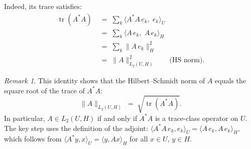 \documentclass[11pt]{article}
\theoremstyle{definition}
\theoremstyle{remark}
\newtheorem{remark}{Remark}
\DeclareMathOperator{\tr}{tr}
\begin{document}
\noindent
Indeed, its trace satisfies:
\begin{align*}
    \tr(A^*\!A)
    &\;=\;
    \sum_{k} \langle A^*\!A\,e_k,\; e_k \rangle_U \\[6pt]
    &\;=\;
    \sum_{k} \langle A\,e_k,\; A\,e_k \rangle_H \\[6pt]
    &\;=\;
    \sum_{k} \|A\,e_k\|_H^2 \\[6pt]
    &\;=\;
    \|A\|_{L_2(U,H)}^2
    \qquad \text{(HS norm)}.
\end{align*}

\begin{remark}
This identity shows that the Hilbert--Schmidt norm of $A$ equals
the square root of the trace of $A^*\!A$:
\[
    \|A\|_{L_2(U,H)}
    \;=\;
    \sqrt{\tr(A^*\!A)}.
\]
In particular, $A \in L_2(U,H)$ if and only if $A^*\!A$ is a
trace-class operator on $U$.
The key step uses the definition of the adjoint:
$\langle A^*\!A\,e_k, e_k \rangle_U = \langle A\,e_k, A\,e_k \rangle_H$,
which follows from $\langle A^*y, x \rangle_U = \langle y, Ax \rangle_H$
for all $x \in U$, $y \in H$.
\end{remark}
\end{document}
